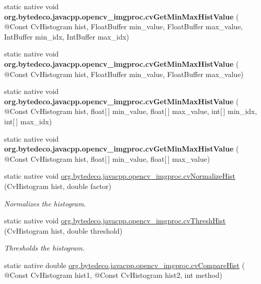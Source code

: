 \begin{DoxyCompactItemize}
\mbox{\label{group__imgproc__c_ga4bb76f75b41f0ef0e9291fb5d23c898b}} 
static native void {\bfseries org.\+bytedeco.\+javacpp.\+opencv\+\_\+imgproc.\+cv\+Get\+Min\+Max\+Hist\+Value} ( @Const Cv\+Histogram hist, Float\+Buffer min\+\_\+value, Float\+Buffer max\+\_\+value, Int\+Buffer min\+\_\+idx, Int\+Buffer max\+\_\+idx)
\item 
\mbox{\label{group__imgproc__c_gad31f6ad74973114c5127c56c3a4e1c79}} 
static native void {\bfseries org.\+bytedeco.\+javacpp.\+opencv\+\_\+imgproc.\+cv\+Get\+Min\+Max\+Hist\+Value} ( @Const Cv\+Histogram hist, Float\+Buffer min\+\_\+value, Float\+Buffer max\+\_\+value)
\item 
\mbox{\label{group__imgproc__c_ga0b588d16fad9889bf7390936ff5c5085}} 
static native void {\bfseries org.\+bytedeco.\+javacpp.\+opencv\+\_\+imgproc.\+cv\+Get\+Min\+Max\+Hist\+Value} ( @Const Cv\+Histogram hist, float\mbox{[}$\,$\mbox{]} min\+\_\+value, float\mbox{[}$\,$\mbox{]} max\+\_\+value, int\mbox{[}$\,$\mbox{]} min\+\_\+idx, int\mbox{[}$\,$\mbox{]} max\+\_\+idx)
\item 
\mbox{\label{group__imgproc__c_gadca9255b36e53fe66c77c2e06f117548}} 
static native void {\bfseries org.\+bytedeco.\+javacpp.\+opencv\+\_\+imgproc.\+cv\+Get\+Min\+Max\+Hist\+Value} ( @Const Cv\+Histogram hist, float\mbox{[}$\,$\mbox{]} min\+\_\+value, float\mbox{[}$\,$\mbox{]} max\+\_\+value)
\item 
static native void \hyperlink{group__imgproc__c_gaae040215ddf5f0582fd04464ea27495f}{org.\+bytedeco.\+javacpp.\+opencv\+\_\+imgproc.\+cv\+Normalize\+Hist} (Cv\+Histogram hist, double factor)
\begin{DoxyCompactList}\small\item\em Normalizes the histogram. \end{DoxyCompactList}\item 
static native void \hyperlink{group__imgproc__c_ga1c1fb991e209c208c788ade579aacc5a}{org.\+bytedeco.\+javacpp.\+opencv\+\_\+imgproc.\+cv\+Thresh\+Hist} (Cv\+Histogram hist, double threshold)
\begin{DoxyCompactList}\small\item\em Thresholds the histogram. \end{DoxyCompactList}\item 
static native double \hyperlink{group__imgproc__c_gae639bb492f6f6f8434a3bf4a6ae085c9}{org.\+bytedeco.\+javacpp.\+opencv\+\_\+imgproc.\+cv\+Compare\+Hist} ( @Const Cv\+Histogram hist1, @Const Cv\+Histogram hist2, int method)

\end{DoxyCompactItemize}
